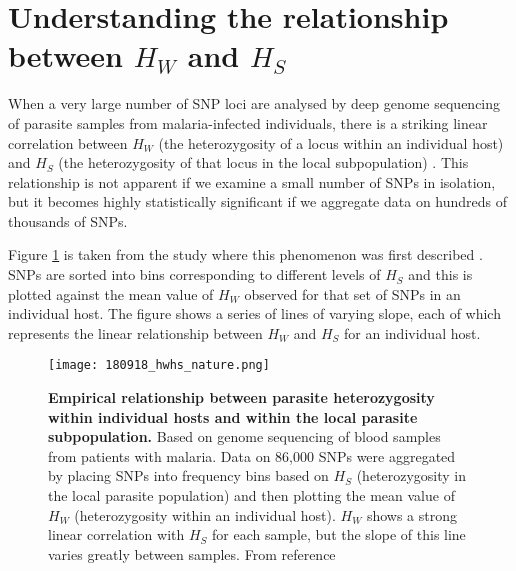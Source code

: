 \documentclass[_main.tex]{subfiles}
\begin{document}


\section*{Understanding the relationship between $H_W$ and $H_S$}
\label{main_section_Hw_Hs}  

When a very large number of SNP loci are analysed by deep genome sequencing of parasite samples from malaria-infected individuals, there is a striking linear correlation between $H_W$ (the heterozygosity of a locus within an individual host) and $H_S$ (the heterozygosity of that locus in the local subpopulation) \cite{Manske2012,Auburn2012}.   This relationship is not apparent if we examine a small number of SNPs in isolation, but it becomes highly statistically significant if we aggregate data on hundreds of thousands of SNPs.

Figure \ref{fig:hwhs_nature} is taken from the study where this phenomenon was first described \cite{Manske2012}.  SNPs are sorted into bins corresponding to different levels of $H_S$ and this is plotted against the mean value of $H_W$ observed for that set of SNPs in an individual host.   The figure shows a series of lines of varying slope, each of which represents the linear relationship between $H_W$ and $H_S$ for an individual host.

\begin{figure}[h!]
\centering
\texttt{[image: 180918\_hwhs\_nature.png]}
\caption{\textbf{Empirical relationship between parasite heterozygosity within individual hosts and within the local parasite subpopulation.}  Based on genome sequencing of blood samples from patients with malaria.  Data on 86,000 SNPs were aggregated by placing SNPs into frequency bins based on $H_S$ (heterozygosity in the local parasite population) and then plotting the mean value of $H_W$ (heterozygosity within an individual host).  $H_W$ shows a strong linear correlation with $H_S$ for each sample, but the slope of this line varies greatly between samples. From reference \cite{Manske2012}}
\label{fig:hwhs_nature}
\end{figure}
\end{document}

